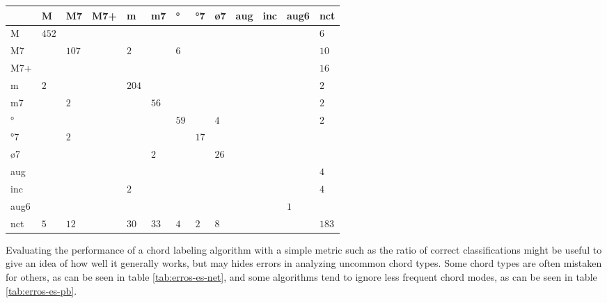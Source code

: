 \documentclass{article}
\begin{document}
\begin{table*}
\centering
\begin{tabular}{l||p{0.55cm}|p{0.55cm}|p{0.55cm}|p{0.55cm}|p{0.55cm}|p{0.55cm}|p{0.55cm}|p{0.55cm}|p{0.55cm}|p{0.55cm}|p{0.55cm}|p{0.55cm}|}
      &     M &    M7 &   M7+ &     m &    m7 &    ° &   °7 &   ø7 &   aug &   inc &  aug6 &   nct  \\  \hline\hline
    M & $ 452 $& $ $& $ $& $ $& $ $& $ $& $ $& $ $& $ $& $ $& $ $& $   6 $ \\ \hline
   M7 & $ $& $ 107 $& $ $& $   2 $& $ $& $   6 $& $ $& $ $& $ $& $ $& $ $& $  10 $ \\ \hline
  M7+ & $ $& $ $& $ $& $ $& $ $& $ $& $ $& $ $& $ $& $ $& $ $& $  16 $ \\ \hline
    m & $   2 $& $ $& $ $& $ 204 $& $ $& $ $& $ $& $ $& $ $& $ $& $ $& $   2 $ \\ \hline
   m7 & $ $& $   2 $& $ $& $ $& $  56 $& $ $& $ $& $ $& $ $& $ $& $ $& $   2 $ \\ \hline
    ° & $ $& $ $& $ $& $ $& $ $& $  59 $& $ $& $   4 $& $ $& $ $& $ $& $   2 $ \\ \hline
   °7 & $ $& $   2 $& $ $& $ $& $ $& $ $& $  17 $& $ $& $ $& $ $& $ $& $ $ \\ \hline
   ø7 & $ $& $ $& $ $& $ $& $   2 $& $ $& $ $& $  26 $& $ $& $ $& $ $& $ $ \\ \hline
  aug & $ $& $ $& $ $& $ $& $ $& $ $& $ $& $ $& $ $& $ $& $ $& $   4 $ \\ \hline
  inc & $ $& $ $& $ $& $   2 $& $ $& $ $& $ $& $ $& $ $& $ $& $ $& $   4 $ \\ \hline
 aug6 & $ $& $ $& $ $& $ $& $ $& $ $& $ $& $ $& $ $& $ $& $   1 $& $ $ \\ \hline
  nct & $   5 $& $  12 $& $ $& $  30 $& $  33 $& $   4 $& $   2 $& $   8 $& $ $& $ $& $ $& $ 183 $ \\ \hline
\end{tabular}


\caption{Classifications made by our best algorithm, \texttt{ES-net}. The rows represent
  the expected answers while the columns are the returned
  results. Note that the matrix is not symmetric.}
\label{tab:erros-es-net}
\end{table*}



Evaluating the performance of a chord labeling algorithm with a simple
metric such as the ratio of correct classifications might be useful to
give an idea of how well it generally works, but may hides errors in
analyzing uncommon chord types. Some chord types are often mistaken
for others, as can be seen in table \ref{tab:erros-es-net}, and some
algorithms tend to ignore less frequent chord modes, as can be seen in
table \ref{tab:erros-es-pb}.
\end{document}
